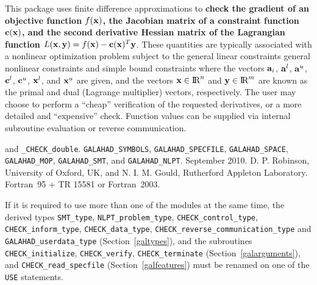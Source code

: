 \documentclass{galahad}
\newcommand{\packagename}{CHECK}
\newcommand{\fullpackagename}{\libraryname\_\packagename}
\begin{document}
\galheader


\galsummary This package uses finite difference approximations to {\bf
check the gradient of an objective function $f({\mathbf{x}})$, the Jacobian
matrix of a constraint function ${\mathbf{c}}({\mathbf{x}})$, and the second
derivative Hessian matrix of the Lagrangian function $L({\mathbf{x}},{\mathbf{y}}) =
f({\mathbf{x}}) - {\mathbf{c}}({\mathbf{x}})^T {\mathbf{y}}$}.  These quantities are typically
associated with a nonlinear optimization problem
subject to the general linear constraints
general nonlinear constraints
and simple bound constraints
where the vectors ${\mathbf{a}}_{i}$, ${\mathbf{a}}^{l}$, ${\mathbf{a}}^{u}$, ${\mathbf{c}}^{l}$,
${\mathbf{c}}^{u}$, ${\mathbf{x}}^{l}$, and ${\mathbf{x}}^{u}$ are given, and the vectors
${\mathbf{x}}\in\hbox{I\hskip -1.5pt R}^n$ and ${\mathbf{y}}\in\hbox{I\hskip -1.5pt R}^m$ are known as the primal and dual (Lagrange
multiplier) vectors, respectively.  The user may choose to perform a ``cheap''
verification of the requested derivatives, or a more detailed
and ``expensive'' check.  Function values can be supplied via internal
subroutine evaluation or reverse communication.


\galattributes
\galversions{\tt  \fullpackagename\_single} and {\tt \fullpackagename\_double}.
\galuses 
{\tt GALAHAD\_SY\-M\-BOLS},
{\tt GAL\-AHAD\_SPECFILE},
{\tt GALAHAD\_SPACE},
{\tt GALAHAD\_MOP},
{\tt GALAHAD\_SMT}, and
{\tt GALAHAD\_NLPT}.
\galdate September 2010.
\galorigin D. P. Robinson, University of Oxford, UK, and
N. I. M. Gould, Rutherford Appleton Laboratory.
\gallanguage Fortran~95 + TR 15581 or Fortran~2003. 


\galhowto




\noindent
If it is required to use more than one of the modules at the same time, 
the derived types
{\tt SMT\_type}, 
{\tt NLPT\_problem\_type}, 
{\tt \packagename\_\-control\_type}, 
{\tt \packagename\_inform\_type},
{\tt \packagename\_data\_type},
{\tt \packagename\_reverse\_communication\_type} and
{\tt GALAHAD\_userdata\_\-type}
(Section~\ref{galtypes}),
and the subroutines
{\tt \packagename\_initialize}, 
{\tt \packagename\_verify},
{\tt \packagename\_terminate}
(Section~\ref{galarguments}),
and 
{\tt \packagename\_read\_specfile}
(Section~\ref{galfeatures})
must be renamed on one of the {\tt USE} statements.
\end{document}
